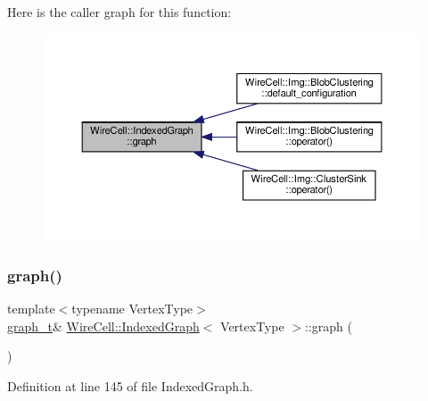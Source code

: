 Here is the caller graph for this function\+:
\nopagebreak
\begin{figure}[H]
\begin{center}
\leavevmode
\includegraphics[width=350pt]{class_wire_cell_1_1_indexed_graph_a73e33d19b8b03611097aa02a2e72dd1d_icgraph}
\end{center}
\end{figure}
\mbox{\label{class_wire_cell_1_1_indexed_graph_a91bb9fbf5b1106979cc5119e606cf396}} 
\subsubsection{\texorpdfstring{graph()}{graph()}\hspace{0.1cm}{\footnotesize\ttfamily [2/2]}}
{\footnotesize\ttfamily template$<$typename Vertex\+Type$>$ \\
\hyperlink{class_wire_cell_1_1_indexed_graph_a5593f08e4be84de33ebf37de7d071819}{graph\+\_\+t}\& \hyperlink{class_wire_cell_1_1_indexed_graph}{Wire\+Cell\+::\+Indexed\+Graph}$<$ Vertex\+Type $>$\+::graph (\begin{DoxyParamCaption}{ }\end{DoxyParamCaption})\hspace{0.3cm}{\ttfamily [inline]}}



Definition at line 145 of file Indexed\+Graph.\+h.

\mbox{\label{class_wire_cell_1_1_indexed_graph_a157b4fedc1ded6acf0479635cb97d8fc}} 
